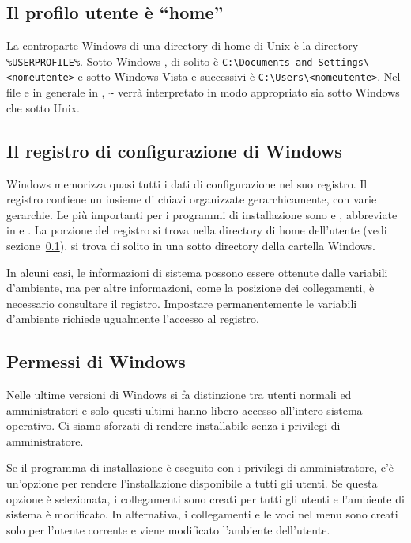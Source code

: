 \documentclass{article}
\begin{document}
\subsection{Il profilo utente è ``home''}
\label{sec:winhome}

La controparte Windows di una directory di home di Unix è la directory
\verb|%USERPROFILE%|. Sotto Windows , di solito
è \verb|C:\Documents and Settings\<nomeutente>| e sotto Windows Vista e
successivi è \verb|C:\Users\<nomeutente>|. Nel file  e in
generale in \KPS{}, \verb|~| verrà interpretato in modo appropriato sia
sotto Windows che sotto Unix.


\subsection{Il registro di configurazione di Windows}
\label{sec:registry}

Windows memorizza quasi tutti i dati di configurazione nel suo registro.
Il registro contiene un insieme di chiavi organizzate gerarchicamente,
con varie gerarchie. Le più importanti per i programmi di installazione
sono  e , abbreviate in
 e . La porzione  del registro si trova
nella directory di home dell'utente (vedi sezione~\ref{sec:winhome}).
 si trova di solito in una sotto directory della cartella
Windows.

In alcuni casi, le informazioni di sistema possono essere ottenute dalle
variabili d'ambiente, ma per altre informazioni, come la posizione dei
collegamenti, è necessario consultare il registro. Impostare
permanentemente le variabili d'ambiente richiede ugualmente l'accesso al
registro.


\subsection{Permessi di Windows}
\label{sec:winpermissions}

Nelle ultime versioni di Windows si fa distinzione tra utenti normali ed
amministratori e solo questi ultimi hanno libero accesso all'intero
sistema operativo. Ci siamo sforzati di rendere \TL{} installabile senza i
privilegi di amministratore.

Se il programma di installazione è eseguito con i privilegi di
amministratore, c'è un'opzione per rendere l'installazione disponibile a
tutti gli utenti. Se questa opzione è selezionata, i collegamenti sono
creati per tutti gli utenti e l'ambiente di sistema è modificato. In
alternativa, i collegamenti e le voci nel menu sono creati solo per
l'utente corrente e viene modificato l'ambiente dell'utente.
\end{document}
